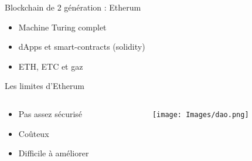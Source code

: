 \documentclass{beamer}
\begin{document}
\begin{frame}[label={sec:org9b18c95}]{Blockchain de 2\ieme{} génération : Etherum}


  \begin{block}{}
    \begin{itemize}
    \item <1-> Machine Turing complet
    \item <2-> dApps et smart-contracts (solidity)
    \item <3> ETH, ETC et gaz
    \end{itemize}
  \end{block}
\end{frame}

\begin{frame}[label={sec:orgc5f9255}]{Les limites d'Etherum}
  \begin{columns}
    \begin{column}{0.39\columnwidth}
      \begin{block}{}
        \begin{itemize}
        \item Pas assez sécurisé
        \item Coûteux
        \item Difficile à améliorer
        \end{itemize}
      \end{block}
    \end{column}
    \begin{column}{0.60\columnwidth}
      \begin{block}{}
        \begin{center}
          \texttt{[image: Images/dao.png]}
        \end{center}
      \end{block}
    \end{column}
  \end{columns}
\end{frame}
\end{document}
